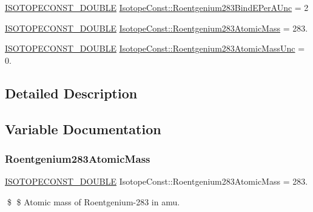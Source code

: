 \begin{DoxyCompactItemize}
\item 
\mbox{\hyperlink{group___isotope_const-_macros_ga8f45a7272ce02c0b4c65c44636ed719a}{I\+S\+O\+T\+O\+P\+E\+C\+O\+N\+S\+T\+\_\+\+D\+O\+U\+B\+LE}} \mbox{\hyperlink{group___isotope_const-_roentgenium-_rg283_ga8e8ffd380d56bc12251443930931610f}{Isotope\+Const\+::\+Roentgenium283\+Bind\+E\+Per\+A\+Unc}} = 2
\item 
\mbox{\hyperlink{group___isotope_const-_macros_ga8f45a7272ce02c0b4c65c44636ed719a}{I\+S\+O\+T\+O\+P\+E\+C\+O\+N\+S\+T\+\_\+\+D\+O\+U\+B\+LE}} \mbox{\hyperlink{group___isotope_const-_roentgenium-_rg283_ga23a399880f6938f5a59c386a9038764a}{Isotope\+Const\+::\+Roentgenium283\+Atomic\+Mass}} = 283.
\item 
\mbox{\hyperlink{group___isotope_const-_macros_ga8f45a7272ce02c0b4c65c44636ed719a}{I\+S\+O\+T\+O\+P\+E\+C\+O\+N\+S\+T\+\_\+\+D\+O\+U\+B\+LE}} \mbox{\hyperlink{group___isotope_const-_roentgenium-_rg283_ga2d1bd475695362caa2d1f382e7dcecc1}{Isotope\+Const\+::\+Roentgenium283\+Atomic\+Mass\+Unc}} = 0.
\end{DoxyCompactItemize}


\subsection{Detailed Description}


\subsection{Variable Documentation}
\mbox{\label{group___isotope_const-_roentgenium-_rg283_ga23a399880f6938f5a59c386a9038764a}} 
\subsubsection{\texorpdfstring{Roentgenium283\+Atomic\+Mass}{Roentgenium283AtomicMass}}
{\footnotesize\ttfamily \mbox{\hyperlink{group___isotope_const-_macros_ga8f45a7272ce02c0b4c65c44636ed719a}{I\+S\+O\+T\+O\+P\+E\+C\+O\+N\+S\+T\+\_\+\+D\+O\+U\+B\+LE}} Isotope\+Const\+::\+Roentgenium283\+Atomic\+Mass = 283.}

\$ \$ Atomic mass of Roentgenium-\/283 in amu. \mbox{\label{group___isotope_const-_roentgenium-_rg283_ga2d1bd475695362caa2d1f382e7dcecc1}} 
